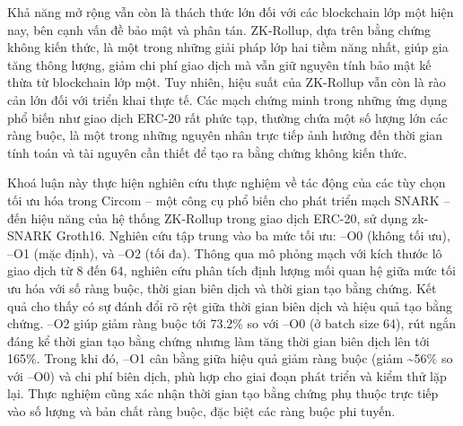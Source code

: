 
Khả năng mở rộng vẫn còn là thách thức lớn đối với các blockchain lớp một hiện nay, bên cạnh vấn đề bảo mật và phân tán. ZK-Rollup, dựa trên bằng chứng không kiến thức, là một trong những giải pháp lớp hai tiềm năng nhất, giúp gia tăng thông lượng, giảm chi phí giao dịch mà vẫn giữ nguyên tính bảo mật kế thừa từ blockchain lớp một. Tuy nhiên, hiệu suất của ZK-Rollup vẫn còn là rào cản lớn đối với triển khai thực tế. Các mạch chứng minh trong những ứng dụng phổ biến như giao dịch ERC-20 rất phức tạp, thường chứa một số lượng lớn các ràng buộc, là một trong những nguyên nhân trực tiếp ảnh hưởng đến thời gian tính toán và tài nguyên cần thiết để tạo ra bằng chứng không kiến thức.

Khoá luận này thực hiện nghiên cứu thực nghiệm về tác động của các tùy chọn tối ưu hóa trong Circom -- một công cụ phổ biến cho phát triển mạch SNARK -- đến hiệu năng của hệ thống ZK-Rollup trong giao dịch ERC-20, sử dụng zk-SNARK Groth16. Nghiên cứu tập trung vào ba mức tối ưu: –O0 (không tối ưu), –O1 (mặc định), và –O2 (tối đa). Thông qua mô phỏng mạch với kích thước lô giao dịch từ 8 đến 64, nghiên cứu phân tích định lượng mối quan hệ giữa mức tối ưu hóa với số ràng buộc, thời gian biên dịch và thời gian tạo bằng chứng. Kết quả cho thấy có sự đánh đổi rõ rệt giữa thời gian biên dịch và hiệu quả tạo bằng chứng. –O2 giúp giảm ràng buộc tới 73.2\% so với –O0 (ở batch size 64), rút ngắn đáng kể thời gian tạo bằng chứng nhưng làm tăng thời gian biên dịch lên tới 165\%. Trong khi đó, –O1 cân bằng giữa hiệu quả giảm ràng buộc (giảm \textasciitilde56\% so với --O0) và chi phí biên dịch, phù hợp cho giai đoạn phát triển và kiểm thử lặp lại. Thực nghiệm cũng xác nhận thời gian tạo bằng chứng phụ thuộc trực tiếp vào số lượng và bản chất ràng buộc, đặc biệt các ràng buộc phi tuyến.

